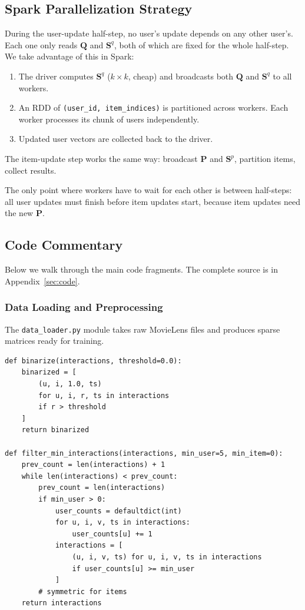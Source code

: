 \documentclass[11pt,a4paper]{article}
\begin{document}
\subsection{Spark Parallelization Strategy}

During the user-update half-step, no user's update depends on any other user's. Each one only reads $\mathbf{Q}$ and $\mathbf{S}^q$, both of which are fixed for the whole half-step. We take advantage of this in Spark:

\begin{enumerate}
\item The driver computes $\mathbf{S}^q$ ($k \times k$, cheap) and broadcasts both $\mathbf{Q}$ and $\mathbf{S}^q$ to all workers.
\item An RDD of \texttt{(user\_id, item\_indices)} is partitioned across workers. Each worker processes its chunk of users independently.
\item Updated user vectors are collected back to the driver.
\end{enumerate}

The item-update step works the same way: broadcast $\mathbf{P}$ and $\mathbf{S}^p$, partition items, collect results.

The only point where workers have to wait for each other is between half-steps: all user updates must finish before item updates start, because item updates need the new $\mathbf{P}$.

\subsection{Code Commentary}

Below we walk through the main code fragments. The complete source is in Appendix~\ref{sec:code}.

\subsubsection{Data Loading and Preprocessing}

The \texttt{data\_loader.py} module takes raw MovieLens files and produces sparse matrices ready for training.

\begin{lstlisting}[caption={Binarization and minimum-interaction filtering.}]
def binarize(interactions, threshold=0.0):
    binarized = [
        (u, i, 1.0, ts)
        for u, i, r, ts in interactions
        if r > threshold
    ]
    return binarized

def filter_min_interactions(interactions, min_user=5, min_item=0):
    prev_count = len(interactions) + 1
    while len(interactions) < prev_count:
        prev_count = len(interactions)
        if min_user > 0:
            user_counts = defaultdict(int)
            for u, i, v, ts in interactions:
                user_counts[u] += 1
            interactions = [
                (u, i, v, ts) for u, i, v, ts in interactions
                if user_counts[u] >= min_user
            ]
        # symmetric for items
    return interactions
\end{lstlisting}
\end{document}

